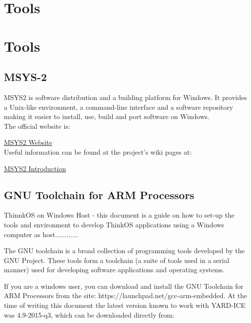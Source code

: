 \section {Tools}
\section{Tools}

\subsection{MSYS-2}

MSYS2 is software distribution and a building platform for Windows. It provides a Unix-like environment, a command-line interface and a software repository making it easier to install, use, build and port software on Windows.\\

The official website is:

\href{http://www.msys2.org/}{MSYS2 Website}\\

Useful information can be found at the project's wiki pages at: 

\href{https://github.com/msys2/msys2/wiki/MSYS2-introduction}{MSYS2 Introduction}\\

\subsection{GNU Toolchain for ARM Processors}

ThinnkOS on Windows Host - this document is a guide on how to set-up the tools and environment to develop ThinkOS applications using a Windows computer as host............

The GNU toolchain is a broad collection of programming tools developed by the GNU Project. These tools form a toolchain (a suite of tools used in a serial manner) used for developing software applications and operating systems.

If you are a windows user, you can download and install the GNU Toolchain for ARM Processors from the site: https://launchpad.net/gcc-arm-embedded. At the time of writing this document the latest version known to work with YARD-ICE was 4.9-2015-q3, which can be downloaded directly from:

